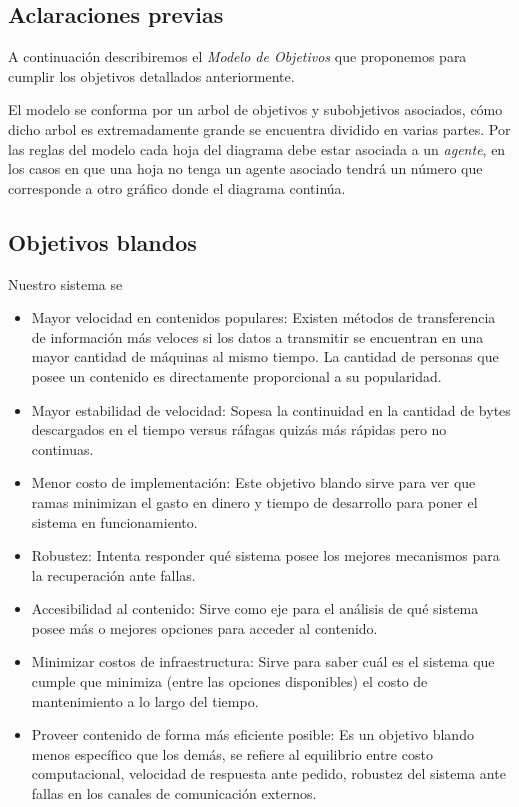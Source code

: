 \documentclass[11pt, a4paper, spanish]{article}
\begin{document}
\subsection{Aclaraciones previas}

	A continuaci\'on describiremos el \emph{Modelo de Objetivos} que proponemos para cumplir los objetivos detallados anteriormente.

	El modelo se conforma por un arbol de objetivos y subobjetivos asociados, c\'omo dicho arbol es extremadamente grande se encuentra 
	dividido en varias partes. Por las reglas del modelo cada hoja del diagrama debe estar asociada a un \emph{agente}, en los casos en que
	una hoja no tenga un agente asociado tendr\'a un n\'umero que corresponde a otro gr\'afico donde el diagrama contin\'ua.
	
\subsection{Objetivos blandos}

	Nuestro sistema se 

	\begin{itemize}

	\item{ Mayor velocidad en contenidos populares: Existen m\'etodos de transferencia de informaci\'on m\'as veloces si los datos a transmitir se 	
	encuentran en una mayor cantidad de m\'aquinas al mismo tiempo. La cantidad de personas que posee un contenido es directamente proporcional a su 
	popularidad.}

	\item{ Mayor estabilidad de velocidad: Sopesa la continuidad en la cantidad de bytes descargados en el tiempo versus r\'afagas quiz\'as m\'as 
	r\'apidas pero no continuas.}

	\item{ Menor costo de implementaci\'on: Este objetivo blando sirve para ver que ramas minimizan el gasto en dinero y tiempo de desarrollo 	
	para poner el sistema en funcionamiento. }

	\item{ Robustez: Intenta responder qu\'e sistema posee los mejores mecanismos para la recuperaci\'on ante fallas.}
    
	\item{ Accesibilidad al contenido: Sirve como eje para el an\'alisis de qu\'e sistema posee m\'as o mejores opciones para acceder al contenido.}

	\item{ Minimizar costos de infraestructura: Sirve para saber cu\'al es el sistema que cumple que minimiza (entre las opciones disponibles) el 
	costo de mantenimiento a lo largo del tiempo.}

	\item{ Proveer contenido de forma m\'as eficiente posible: Es un objetivo blando menos espec\'ifico que los dem\'as, se refiere al equilibrio entre 
	costo computacional, velocidad de respuesta ante pedido, robustez del sistema ante fallas en los canales de comunicaci\'on externos.}

	\end{itemize}
\end{document}
